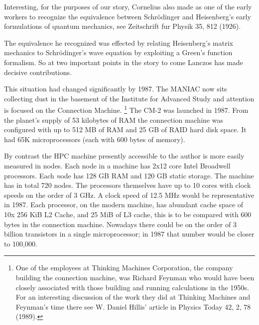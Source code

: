 Interesting, for the purposes of our story, 
Cornelius also made as one of the early workers
to recognize the equivalence between Schr\"odinger and Heisenberg's early
formulations of quantum mechanics, see Zeitschrift fur Physik 35, 812 (1926). 

The equivalence he recognized was effected by relating Heisenberg's matrix mechanics to
Schr\"odinger's wave equation by exploiting a Green's function formalism. 
So at two important points in the story to come Lanczos has made 
decisive contributions.


This situation had changed significantly by 1987. The MANIAC now sits collecting dust in
the basement of the Institute for Advanced Study and attention 
is focused on the Connection Machine.
\footnote{One of the employees at Thinking Machines Corporation,
the company building the connection machine, was Richard Feynman
who would have been closely associated with those building and running
calculations in the 1950s. For an interesting discussion of the work they
did at Thinking Machines and Feynman's time there see W. Daniel
Hillis' article in Physics Today 42, 2, 78 (1989).}
The CM-2 was launched in 1987. From the planet's supply of 53 kilobytes of RAM
the connection machine was configured with up to 512 MB of RAM and 25 GB of RAID
hard disk space. It had 65K microprocessors (each with 600 bytes of memory). 

By contrast the HPC machine presently accessible to the author 
is more easily measured in nodes. Each node in a machine has 2x12 core Intel Broadwell processors.
Each {\emph node} has 128 GB RAM and 120 GB static storage. The machine has in total 720 nodes. 
The processors themselves have up to 10 cores with clock speeds 
on the order of 3 GHz. A clock speed of 12.5 MHz would be representative in 1987. 
Each processor, on the modern machine, has abundant cache 
space of 10x 256 KiB L2 Cache, and 25 MiB of L3 cache,
this is to be compared with 600 bytes in the connection machine. 
Nowadays there could be on the order of 3 billion 
transistors in a single microprocessor;
in 1987 that number would be closer to 100,000. 

